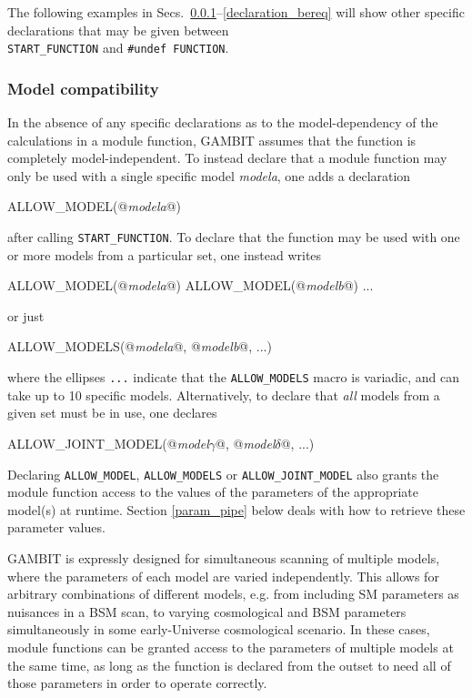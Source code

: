 \documentclass[pdftex,twocolumn,epjc3_preprint,runningheads]{svjour3}
\renewcommand{\_}{\discretionary{\underscore}{}{\underscore}}
\newcommand\cpp[1]{{\lstinline!#1!}}  %
\newcommand{\metavarf}[1]{\textit{\color{darkgreen}\footnotesize\textrm{#1}}}
\newcommand{\metavar}{\metavarf}
\newcommand{\gambit}{\textsf{GAMBIT}\xspace}
\newcommand{\GB}{\gambit}
\begin{document}
The following examples in Secs.\ \ref{declaration_allow_model}--\ref{declaration_bereq} will show other specific declarations that may be given between\\\lstinline{START_FUNCTION} and \lstinline{#undef FUNCTION}.

\subsubsection{Model compatibility}
\label{declaration_allow_model}

In the absence of any specific declarations as to the model-dependency of the calculations in a module function, \GB assumes that the function is completely model-independent.  To instead declare that a module function may only be used with a single specific model \metavar{model\_a}, one adds a declaration
\begin{lstcpp}
ALLOW_MODEL(@\metavar{model\_a}@)
\end{lstcpp}
after calling \lstinline|START_FUNCTION|.  To declare that the function may be used with one or more models from a particular set, one instead writes
\begin{lstcpp}
ALLOW_MODEL(@\metavar{model\_a}@)
ALLOW_MODEL(@\metavar{model\_b}@)
...
\end{lstcpp}
or just
\begin{lstcpp}
ALLOW_MODELS(@\metavar{model\_a}@, @\metavar{model\_b}@, ...)
\end{lstcpp}
where the ellipses \cpp{...} indicate that the \lstinline|ALLOW_MODELS| macro is variadic, and can take up to 10 specific models.  Alternatively, to declare that \textit{all} models from a given set must be in use, one declares
\begin{lstcpp}
ALLOW_JOINT_MODEL(@\metavar{model\_$\gamma$}@, @\metavar{model\_$\delta$}@, ...)
\end{lstcpp}
Declaring \lstinline|ALLOW_MODEL|, \lstinline|ALLOW_MODELS| or \lstinline|ALLOW_JOINT_MODEL| also grants the module function access to the values of the parameters of the appropriate model(s) at runtime.  Section \ref{param_pipe} below deals with how to retrieve these parameter values.

\GB is expressly designed for simultaneous scanning of multiple models, where the parameters of each model are varied independently.  This allows for arbitrary combinations of different models, e.g. from including SM parameters as nuisances in a BSM scan, to varying cosmological and BSM parameters simultaneously in some early-Universe cosmological scenario.  In these cases, module functions can be granted access to the parameters of multiple models at the same time, as long as the function is declared from the outset to need all of those parameters in order to operate correctly.
\end{document}
